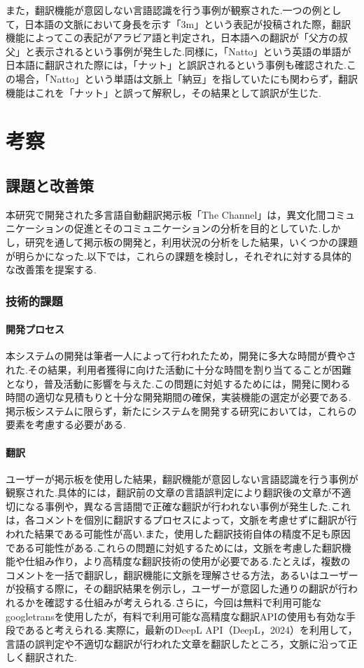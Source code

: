 \documentclass[b5paper,12pt,dvipdfmx]{jsreport}
\begin{document}
また，翻訳機能が意図しない言語認識を行う事例が観察された.一つの例として，日本語の文脈において身長を示す「3m」という表記が投稿された際，翻訳機能によってこの表記がアラビア語と判定され，日本語への翻訳が「父方の叔父」と表示されるという事例が発生した.同様に，「Natto」という英語の単語が日本語に翻訳された際には，「ナット」と誤訳されるという事例も確認された.この場合，「Natto」という単語は文脈上「納豆」を指していたにも関わらず，翻訳機能はこれを「ナット」と誤って解釈し，その結果として誤訳が生じた.


\chapter{考察}

\section{課題と改善策}
本研究で開発された多言語自動翻訳掲示板「The Channel」は，異文化間コミュニケーションの促進とそのコミュニケーションの分析を目的としていた.しかし，研究を通して掲示板の開発と，利用状況の分析をした結果，いくつかの課題が明らかになった.以下では，これらの課題を検討し，それぞれに対する具体的な改善策を提案する.

\subsection{技術的課題}

\subsubsection{開発プロセス}
本システムの開発は筆者一人によって行われたため，開発に多大な時間が費やされた.その結果，利用者獲得に向けた活動に十分な時間を割り当てることが困難となり，普及活動に影響を与えた.この問題に対処するためには，開発に関わる時間の適切な見積もりと十分な開発期間の確保，実装機能の選定が必要である.掲示板システムに限らず，新たにシステムを開発する研究においては，これらの要素を考慮する必要がある.

\subsubsection{翻訳}
ユーザーが掲示板を使用した結果，翻訳機能が意図しない言語認識を行う事例が観察された.具体的には，翻訳前の文章の言語誤判定により翻訳後の文章が不適切になる事例や，異なる言語間で正確な翻訳が行われない事例が発生した.これは，各コメントを個別に翻訳するプロセスによって，文脈を考慮せずに翻訳が行われた結果である可能性が高い.また，使用した翻訳技術自体の精度不足も原因である可能性がある.これらの問題に対処するためには，文脈を考慮した翻訳機能や仕組み作り，より高精度な翻訳技術の使用が必要である.たとえば，複数のコメントを一括で翻訳し，翻訳機能に文脈を理解させる方法，あるいはユーザーが投稿する際に，その翻訳結果を例示し，ユーザーが意図した通りの翻訳が行われるかを確認する仕組みが考えられる.さらに，今回は無料で利用可能なgoogletransを使用したが，有料で利用可能な高精度な翻訳APIの使用も有効な手段であると考えられる.実際に，最新のDeepL API（DeepL，2024）を利用して，言語の誤判定や不適切な翻訳が行われた文章を翻訳したところ，文脈に沿って正しく翻訳された.
\end{document}

